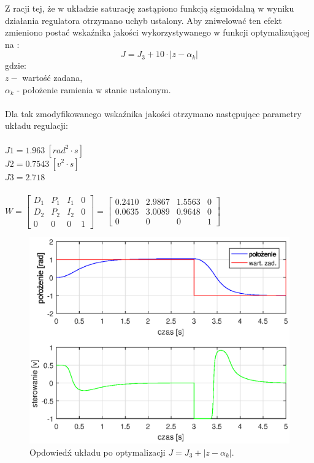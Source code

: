 Z racji tej, że w układzie saturację zastąpiono funkcją sigmoidalną w wyniku działania regulatora otrzymano uchyb ustalony. Aby zniwelować ten efekt zmieniono postać wska\'znika jakości wykorzystywanego w funkcji optymalizującej na :
\begin{equation}\label{key}
J = J_3 + 10 \cdot |z - \alpha_k|
\end{equation}
gdzie:\\
$z - $ wartość zadana,\\
$\alpha_k$ - położenie ramienia w stanie ustalonym.\\\\
Dla tak zmodyfikowanego wska\'znika jakości otrzymano następujące parametry układu regulacji:\\
\\
$J1 = 1.963 \ [rad^2 \cdot s]$\\
$J2 = 0.7543 \ [v^2 \cdot s] $\\
$J3 = 2.718$ \\
\\
$W = \begin{bmatrix}
	D_1& P_1& I_1&0\\
	D_2& P_2& I_2&0\\
	0&0&0&1
	\end{bmatrix} = 
	 \begin{bmatrix}
	 	0.2410&2.9867& 1.5563&0\\
	0.0635& 3.0089&0.9648&0\\
	0&0&0&1
	\end{bmatrix} 
$

\begin{figure}[h!]
	\centering
	\includegraphics[scale = 1]{fig/neural_opt_uchyb.eps}
	\caption		
	{Opdowied\'x układu po optymalizacji $J = J_3 + |z - \alpha_k|$.}
	\label{neuron_ster_opt_uchyb}
\end{figure}

